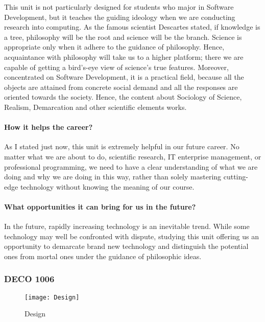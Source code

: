 \documentclass[12pt, a4paper]{article}
\begin{document}
This unit is not particularly designed for students who major in Software Development, but it teaches the guiding ideology when we are conducting research into computing. As the famous scientist Descartes\marginpar{\textcolor{blue}{\tiny French philosopher, mathematician, and scientist}} stated, if knowledge is a tree, philosophy will be the root and science will be the branch. Science is appropriate only when it adhere to the guidance of philosophy. Hence, acquaintance with philosophy will take us to a higher platform; there we are capable of getting a bird's-eye view of science’s true features. Moreover, concentrated on Software Development, it is a practical field, because all the objects are attained from concrete social demand and all the responses are oriented towards the society. Hence, the content about Sociology of Science, Realism, Demarcation and other scientific elements works. 

	\paragraph {How it helps the career?}

As I stated just now, this unit is extremely helpful in our future career. No matter what we are about to do, scientific research, IT enterprise management, or professional programming, we need to have a clear understanding of what we are doing and why we are doing in this way, rather than solely mastering cutting-edge technology without knowing the meaning of our course. 

	\paragraph {What opportunities it can bring for us in the future?}

In the future, rapidly increasing technology is an inevitable trend. While some technology may well be confronted with dispute, studying this unit offering us an opportunity to demarcate brand new technology and distinguish the potential ones from mortal ones under the guidance of philosophic ideas.

	\clearpage
	
	\subsubsection {DECO 1006}

	\begin{figure}[h]
	\centering
	\texttt{[image: Design]}
	\caption{Design}
	\end{figure}
\end{document}
